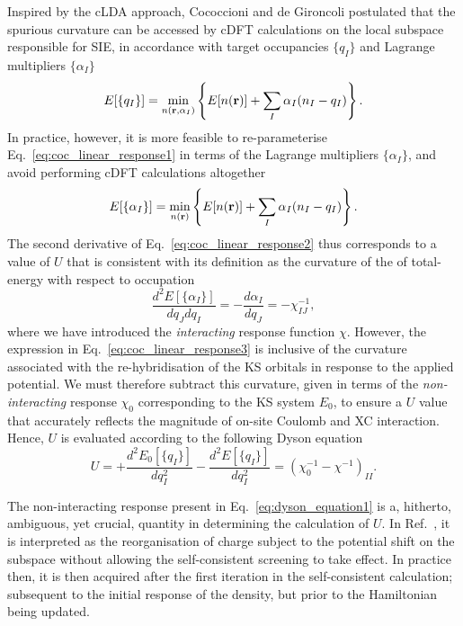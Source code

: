 Inspired by the cLDA approach, 
Cococcioni and de Gironcoli 
postulated that the spurious curvature 
can be accessed by cDFT calculations 
on the local subspace responsible for SIE, 
in accordance with target occupancies $\{q_I\}$ 
and Lagrange multipliers $\{\alpha_I\}$
%
\begin{equation}
E[\{q_I\}]=\min_{n({{\bf r}},\alpha_I)}\left\{E[n({{\bf r}})]+\sum_I\alpha_I(n_I-q_I)\right\}
\label{eq:coc_linear_response1}.
\end{equation}
%
In practice, however, 
it is more feasible to re-parameterise 
Eq.~\eqref{eq:coc_linear_response1} 
in terms of the Lagrange multipliers $\{\alpha_I\}$, 
and avoid performing cDFT calculations altogether 
% 
\begin{equation}
E[\{\alpha_I\}]=\min_{n({{\bf r}})}\left\{E[n({{\bf r}})]+\sum_I\alpha_I(n_I-q_I)\right\}.
\label{eq:coc_linear_response2}
\end{equation}
%
The second derivative of Eq.~\eqref{eq:coc_linear_response2} 
thus corresponds to a value of $U$ that is consistent with 
its definition as the curvature 
of the of total-energy with respect to occupation 
%
\begin{equation}
\frac{d^2E[\{\alpha_I\}]}{d q_Jd q_I}
=-\frac{d\alpha_I}{d q_J} = -\chi_{IJ}^{-1},
\label{eq:coc_linear_response3}
\end{equation}
%
where we have introduced the 
{\it interacting} response function $\chi$.
%
However, the expression in Eq.~\eqref{eq:coc_linear_response3} 
is inclusive of the curvature associated with 
the re-hybridisation of the KS orbitals 
in response to the applied potential.
%
We must therefore subtract this curvature, 
given in terms of the 
{\it non-interacting} response $\chi_0$
corresponding to the KS system $E_0$,
to ensure a $U$ value that 
accurately reflects the magnitude  
of on-site Coulomb {and XC} interaction.
%
Hence,  $U$ is evaluated 
according to the following Dyson equation 
%
\begin{equation}
U=+\frac{d^2E_0[\{q_I\}]}{d q_I^2}-\frac{d^2E[\{q_I\}]}{d q_I^2}
=(\chi_0^{-1}-\chi^{-1})_{II}.
\label{eq:dyson_equation1}
\end{equation}
%

The non-interacting response 
present in Eq.~\eqref{eq:dyson_equation1} 
is a, {hitherto}, ambiguous, yet crucial, quantity 
in determining the calculation of $U$.
% 
In Ref.~\cite{PhysRevB.71.035105}, 
it is interpreted as the reorganisation of charge 
subject to the potential shift on the subspace 
without allowing the self-consistent screening to take effect.
%
In practice then, 
it is then acquired after the first iteration in 
the self-consistent calculation; 
subsequent to the initial response of the density, 
but prior to the Hamiltonian being updated.


